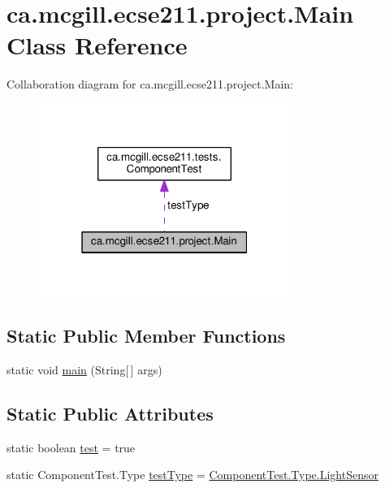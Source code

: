 \hypertarget{classca_1_1mcgill_1_1ecse211_1_1project_1_1_main}{}\section{ca.\+mcgill.\+ecse211.\+project.\+Main Class Reference}
\label{classca_1_1mcgill_1_1ecse211_1_1project_1_1_main}


Collaboration diagram for ca.\+mcgill.\+ecse211.\+project.\+Main\+:\nopagebreak
\begin{figure}[H]
\begin{center}
\leavevmode
\includegraphics[width=232pt]{classca_1_1mcgill_1_1ecse211_1_1project_1_1_main__coll__graph}
\end{center}
\end{figure}
\subsection*{Static Public Member Functions}
\begin{DoxyCompactItemize}
\item 
static void \hyperlink{classca_1_1mcgill_1_1ecse211_1_1project_1_1_main_af681b5dc675c13ed284071cc135f5fd3}{main} (String\mbox{[}$\,$\mbox{]} args)
\end{DoxyCompactItemize}
\subsection*{Static Public Attributes}
\begin{DoxyCompactItemize}
\item 
static boolean \hyperlink{classca_1_1mcgill_1_1ecse211_1_1project_1_1_main_af6f7b8fffddcf855f74fe128d2e23ea1}{test} = true
\item 
static Component\+Test.\+Type \hyperlink{classca_1_1mcgill_1_1ecse211_1_1project_1_1_main_a8dac740460370f76ac0db5dc20824b1f}{test\+Type} = \hyperlink{enumca_1_1mcgill_1_1ecse211_1_1tests_1_1_component_test_1_1_type_aa8c9262ad5014cd52ecce2eec6604510}{Component\+Test.\+Type.\+Light\+Sensor}
\end{DoxyCompactItemize}


